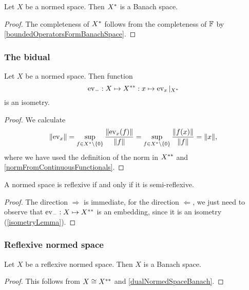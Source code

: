 \begin{lemma} \label{dualNormedSpaceBanach}
Let $X$ be a normed space. Then ${X}^*$ is a Banach space.
\end{lemma}
\begin{proof}
The completeness of ${X}^*$ follows from the completeness of $\mathbb{F}$ by \ref{boundedOperatorsFormBanachSpace}.
\end{proof}

\subsubsection{The bidual}

\begin{proposition} \label{canonicalIsometryIsometry}
Let $X$ be a normed space. Then function
\[ \operatorname{ev}_-: X\mapsto {X}^{**}: x\mapsto \operatorname{ev}_x|_{{X}^*} \]
is an isometry.
\end{proposition}
\begin{proof}
We calculate
\[ \lVert\operatorname{ev}_x\rVert = \sup_{f\in {X}^*\setminus\{0\}} \frac{\lVert\operatorname{ev}_x(f)\rVert}{\lVert f\rVert} = \sup_{f\in {X}^*\setminus\{0\}} \frac{\lVert f(x)\rVert}{\lVert f\rVert} = \lVert x\rVert, \]
where we have used the definition of the norm in ${X}^{**}$ and \ref{normFromContinuousFunctionals}.
\end{proof}
\begin{corollary} \label{normedReflexiveIFFSemireflexive}
A normed space is reflexive \textup{if and only if} it is semi-reflexive.
\end{corollary}
\begin{proof}
The direction $\Rightarrow$ is immediate, for the direction $\Leftarrow$, we just need to observe that $\operatorname{ev}_-: X\mapsto {X}^{**}$ is an embedding, since it is an isometry (\ref{isometryLemma}).
\end{proof}

\subsubsection{Reflexive normed space}
\begin{proposition}
Let $X$ be a reflexive normed space. Then $X$ is a Banach space.
\end{proposition}
\begin{proof}
This follows from $X\cong {X}^{**}$ and \ref{dualNormedSpaceBanach}.
\end{proof}

